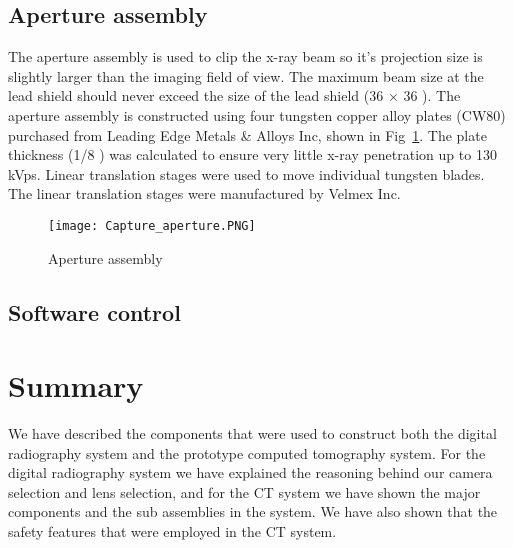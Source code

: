 \subsection{Aperture assembly}
The aperture assembly is used to clip the x-ray beam so it's projection size is slightly larger than the imaging field of view.  The maximum beam size at the lead shield should never exceed the size of the lead shield (36 \inches $\times$ 36 \inches).  The aperture assembly is constructed using four tungsten copper alloy plates (CW80) purchased from Leading Edge Metals \& Alloys Inc, shown in Fig~\ref{fig:aperture}.  The plate thickness (1/8 \inches) was calculated to ensure very little x-ray penetration up to 130 kVps.  Linear translation stages were used to move individual tungsten blades.  The linear translation stages were manufactured by Velmex Inc.

\begin{figure}
\centering
\texttt{[image: Capture\_aperture.PNG]}
\caption{Aperture assembly}
\label{fig:aperture}
\end{figure}

\subsection{Software control}


\section{Summary}
We have described the components that were used to construct both the digital radiography system and the prototype computed tomography system.  For the digital radiography system we have explained the reasoning behind our camera selection and lens selection, and for the CT system we have shown the major components and the sub assemblies in the system.  We have also shown that the safety features that were employed in the CT system.  